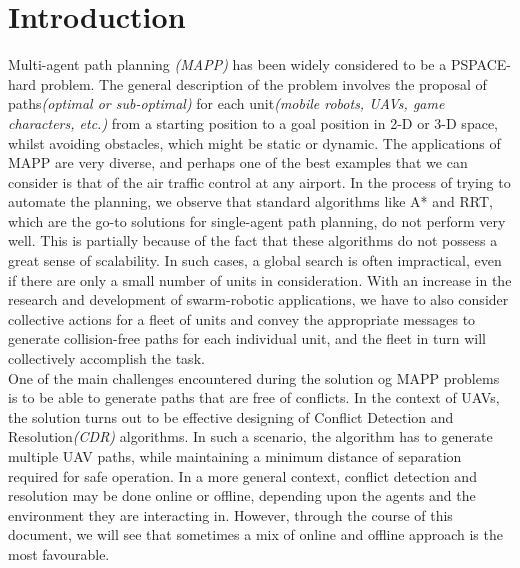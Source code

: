 


\maketitle
\nocite{*}

\section{Introduction}
Multi-agent path planning \textit{(MAPP)} has been widely considered to be a PSPACE-hard problem. The general description of the problem involves the proposal of paths\textit{(optimal or sub-optimal)} for each unit\textit{(mobile robots, UAVs, game characters, etc.)} from a starting position to a goal position in 2-D or 3-D space, whilst avoiding obstacles, which might be static or dynamic. The applications of MAPP are very diverse, and perhaps one of the best examples that we can consider is that of the air traffic control at any airport. In the process of trying to automate the planning, we observe that standard algorithms like A* and RRT, which are the go-to solutions for single-agent path planning, do not perform very well. This is partially because of the fact that these algorithms do not possess a great sense of scalability. In such cases, a global search is often impractical, even if there are only a small number of units in consideration. With an increase in the research and development of swarm-robotic applications, we have to also consider collective actions for a fleet of units and convey the appropriate messages to generate collision-free paths for each individual unit, and the fleet in turn will collectively accomplish the task.\\

One of the main challenges encountered during the solution og MAPP problems is to be able to generate paths that are free of conflicts. In the context of UAVs, the solution turns out to be effective designing of Conflict Detection and Resolution\textit{(CDR)} algorithms. In such a scenario, the algorithm has to generate multiple UAV paths, while maintaining a minimum distance of separation required for safe operation. In a more general context, conflict detection and resolution may be done online or offline, depending upon the agents and the environment they are interacting in. However, through the course of this document, we will see that sometimes a mix of online and offline approach is the most favourable.\\

